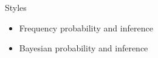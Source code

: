 \documentclass[11pt]{beamer}
\begin{document}
\begin{frame}{
	\begin{minipage}[t]{0.55\textwidth}
		Styles
	\end{minipage}
	\hfill
	\begin{minipage}[t]{0.35\textwidth}
		\flushright
	\end{minipage}
}{}
\begin{itemize}
	\item Frequency probability and inference
	\item Bayesian probability and inference
\end{itemize}
\end{frame}
\end{document}
